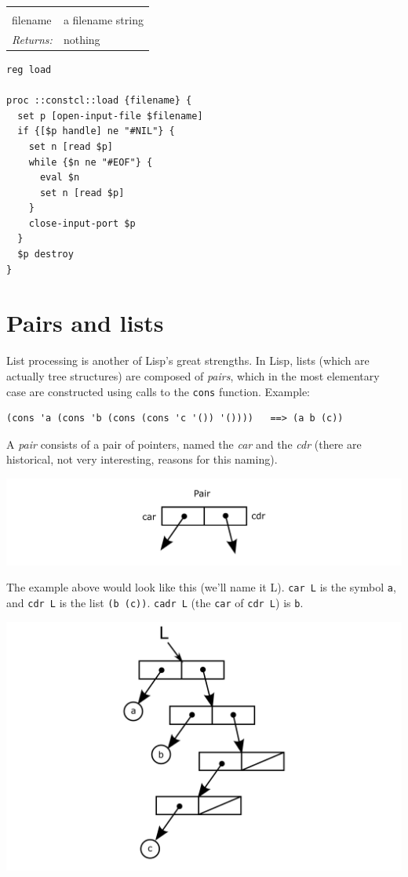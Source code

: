 \documentclass[twoside,9pt]{report}
\begin{document}
\noindent\begin{tabular}{ |p{1.9cm} p{8cm}| }
\hline
\rowcolor[HTML]{CCCCCC} \multicolumn{2}{|l|}{\bf load (public)} \\
filename & a filename string \\
\textit{Returns:} & nothing \\
\hline
\end{tabular}
\begin{lstlisting}
reg load

proc ::constcl::load {filename} {
  set p [open-input-file $filename]
  if {[$p handle] ne "#NIL"} {
    set n [read $p]
    while {$n ne "#EOF"} {
      eval $n
      set n [read $p]
    }
    close-input-port $p
  }
  $p destroy
}
\end{lstlisting}
\section{Pairs and lists}
\label{pairs-and-lists}


List processing is another of Lisp's great strengths. In Lisp, lists (which are actually tree structures) are composed of \emph{pairs}, which in the most elementary case are constructed using calls to the \texttt{cons} function. Example:

\begin{verbatim}
(cons 'a (cons 'b (cons (cons 'c '()) '())))   ==> (a b (c))
\end{verbatim}


A \emph{pair} consists of a pair of pointers, named the \emph{car} and the \emph{cdr} (there are historical, not very interesting, reasons for this naming).

\includegraphics{images/pair.png}


The example above would look like this (we'll name it L). \texttt{car L} is the symbol \texttt{a}, and \texttt{cdr L} is the list \texttt{(b (c))}. \texttt{cadr L} (the \texttt{car} of \texttt{cdr L}) is \texttt{b}.

\includegraphics{images/tree.png}
\end{document}
